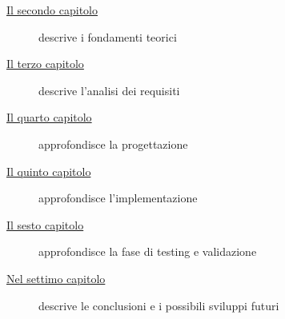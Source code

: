 \begin{description}
    \item[{\hyperref[cap:fondamentiteorici]{Il secondo capitolo}}] descrive i fondamenti teorici
    
    \item[{\hyperref[cap:analisi-requisiti]{Il terzo capitolo}}] descrive l'analisi dei requisiti
    
    \item[{\hyperref[cap:progettazione]{Il quarto capitolo}}] approfondisce la progettazione
    
    \item[{\hyperref[cap:implementazione]{Il quinto capitolo}}] approfondisce l'implementazione
    
    \item[{\hyperref[cap:testing]{Il sesto capitolo}}] approfondisce la fase di testing e validazione
    
    \item[{\hyperref[cap:conclusioni]{Nel settimo capitolo}}] descrive le conclusioni e i possibili sviluppi futuri
\end{description}

